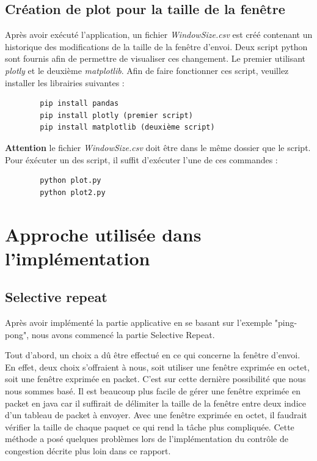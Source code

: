 \documentclass{article}
\begin{document}
\subsection{Création de plot pour la taille de la fenêtre}
Après avoir exécuté l'application, un fichier \emph{WindowSize.csv} est créé contenant
un historique des modifications de la taille de la fenêtre d'envoi.
Deux script python sont fournis afin de permettre de visualiser ces changement.
Le premier utilisant \emph{plotly} et le deuxième \emph{matplotlib}.
Afin de faire fonctionner ces script, veuillez installer les librairies suivantes : 
\begin{center}
    \begin{verbatim}
        pip install pandas
        pip install plotly (premier script)
        pip install matplotlib (deuxième script)
    \end{verbatim}
\end{center}
\textbf{Attention} le fichier \textit{WindowSize.csv} doit être dans le même dossier que le script.
Pour éxécuter un des script, il suffit d'exécuter l'une de ces commandes :
\begin{center}
    \begin{verbatim}
        python plot.py
        python plot2.py
    \end{verbatim} 
\end{center}

\newpage

\section{Approche utilisée dans l'implémentation}

\subsection{Selective repeat}
Après avoir implémenté la partie applicative en se basant sur l'exemple "ping-pong", 
nous avons commencé la partie Selective Repeat.
\vspace{0.5cm}

Tout d'abord, un choix a dû être effectué en ce qui concerne la fenêtre d'envoi. 
En effet, deux choix s'offraient à nous, soit utiliser une fenêtre exprimée en octet,
soit une fenêtre exprimée en packet.
C'est sur cette dernière possibilité que nous nous sommes basé. Il est beaucoup plus facile de gérer une fenêtre exprimée
en packet en java car il suffirait de délimiter la taille de la fenêtre entre deux indice d'un tableau de packet à envoyer.
Avec une fenêtre exprimée en octet, il faudrait vérifier la taille de chaque paquet ce qui rend la tâche plus compliquée.
Cette méthode a posé quelques problèmes lors de l'implémentation du contrôle de congestion décrite plus loin dans ce rapport.
\vspace{0.5cm}
\end{document}
